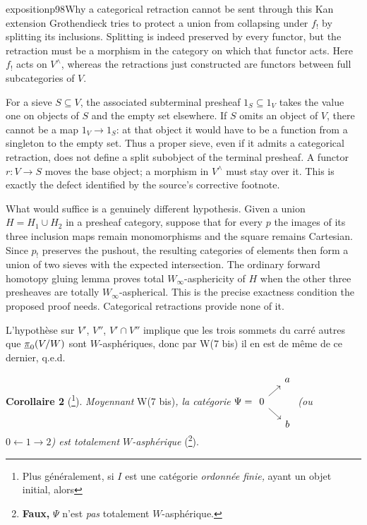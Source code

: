 \begin{dcomment}{exposition}{p98}{Why a categorical retraction cannot be sent through this Kan extension}
Grothendieck tries to protect a union from collapsing under $f_!$ by splitting its inclusions. Splitting is indeed preserved by every functor, but the retraction must be a morphism in the category on which that functor acts. Here $f_!$ acts on $V^{\wedge}$, whereas the retractions just constructed are functors between full subcategories of $V$.

For a sieve $S\subseteq V$, the associated subterminal presheaf $1_S\subseteq1_V$ takes the value one on objects of $S$ and the empty set elsewhere. If $S$ omits an object of $V$, there cannot be a map $1_V\to1_S$: at that object it would have to be a function from a singleton to the empty set. Thus a proper sieve, even if it admits a categorical retraction, does not define a split subobject of the terminal presheaf. A functor $r:V\to S$ moves the base object; a morphism in $V^{\wedge}$ must stay over it. This is exactly the defect identified by the source's corrective footnote.

What would suffice is a genuinely different hypothesis. Given a union $H=H_1\cup H_2$ in a presheaf category, suppose that for every $p$ the images of its three inclusion maps remain monomorphisms and the square remains Cartesian. Since $p_!$ preserves the pushout, the resulting categories of elements then form a union of two sieves with the expected intersection. The ordinary forward homotopy gluing lemma proves total $W_\infty$-asphericity of $H$ when the other three presheaves are totally $W_\infty$-aspherical. This is the precise exactness condition the proposed proof needs. Categorical retractions provide none of it.
\end{dcomment}


L'hypothèse sur $V'$, $V''$, $V'\cap V''$ implique que les trois sommets du carré autres que $\underline{\pi}_0(V/W)$ sont $W$-asphériques, donc par W(7 bis) il en est de même de ce dernier, q.e.d.

\textbf{Corollaire 2} (\footnote{Plus généralement, si $I$ est une catégorie \textit{ordonnée finie,} ayant un objet initial, alors}). \textit{Moyennant} W(7 bis)\textit{, la catégorie} $\Psi = \begin{tikzcd}[ampersand replacement=\&, row sep=small, column sep=small, baseline=(B.base)]
 \& a \\
|[alias=B]| 0 \arrow[ur] \arrow[dr] \& \\
 \& b
\end{tikzcd}$ \textit{(ou $0 \longleftarrow 1 \longrightarrow 2$) est totalement $W$-asphérique} (\footnote{\textbf{Faux,} $\Psi$ n'est \textit{pas} totalement $W$-asphérique.}).

